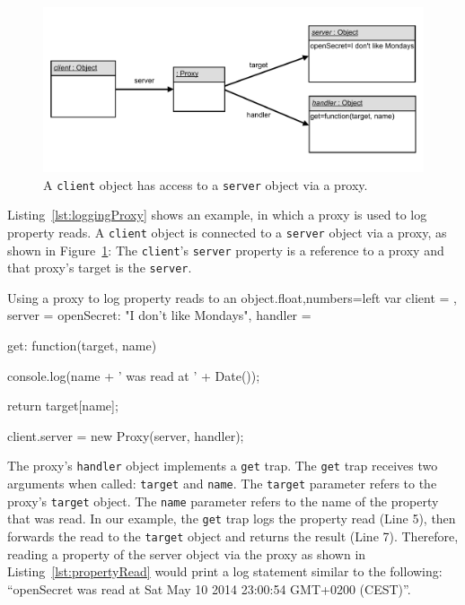 \begin{figure}[h]
    \centering
    \includegraphics[width=\textwidth]{figures/5_implementation/1_loggingProxy.pdf}
    \caption{A \lstinline{client} object has access to a \lstinline{server} object via a proxy.}
    \label{fig:LoggingProxy}
\end{figure}

Listing~\ref{lst:loggingProxy} shows an example, in which a proxy is used to log property reads.
A \lstinline{client} object is connected to a \lstinline{server} object via a proxy, as shown in Figure~\ref{fig:LoggingProxy}:
The \lstinline{client}'s \lstinline{server} property is a reference to a proxy and that proxy's target is the \lstinline{server}.

\begin{code}{Using a proxy to log property reads to an object.}{float,numbers=left}
var client = {},
    server = {openSecret: "I don't like Mondays"},
    handler = {
        get: function(target, name) {
            console.log(name + ' was read at ' + Date());
            
            return target[name];
        }
    }

client.server = new Proxy(server, handler);
\end{code}
\label{lst:loggingProxy}
\iffalse
\end{verbatim}\fi

The proxy's \lstinline{handler} object implements a \lstinline{get} trap.
The \lstinline{get} trap receives two arguments when called: \lstinline{target} and \lstinline{name}.
The \lstinline{target} parameter refers to the proxy's \lstinline{target} object.
The \lstinline{name} parameter refers to the name of the property that was read.
In our example, the \lstinline{get} trap logs the property read (Line 5), then forwards the read to the \lstinline{target} object and returns the result (Line 7).
Therefore, reading a property of the server object via the proxy as shown in Listing~\ref{lst:propertyRead} would print a log statement similar to the following: ``openSecret was read at Sat May 10 2014 23:00:54 GMT+0200 (CEST)''.

